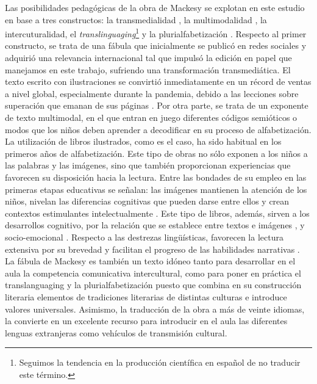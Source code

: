 \documentclass[spanish]{textolivre}
\begin{document}
Las posibilidades pedagógicas de la obra de Mackesy se explotan en este estudio en base a tres constructos: la transmedialidad \cite{scolari_narrativas_2013}, la multimodalidad \cite{hassett_theories_2009,serafini_reading_2012,serafini_multimodal_2015,pantaleo_primary_2016-1}, la intercuturalidad, el \textit{translinguaging}\footnote{Seguimos la tendencia en la producción científica en español de no traducir este término.} y la plurialfabetización \cite{byram_teaching_1997,byram_teaching_2021,garcia_translanguaging_2020,meyer_pluriliteracies_2015}.  Respecto al primer constructo, se trata de una fábula que inicialmente se publicó en redes sociales y adquirió una relevancia internacional tal que impulsó la edición en papel que manejamos en este trabajo, sufriendo una transformación transmediática. El texto escrito con ilustraciones se convirtió inmediatamente en un récord de ventas a nivel global, especialmente durante la pandemia, debido a las lecciones sobre superación que emanan de sus páginas \cite{kobierski_reality_2021}. Por otra parte, se trata de un exponente de texto multimodal, en el que entran en juego diferentes códigos semióticos o modos que los niños deben aprender a decodificar en su proceso de alfabetización. La utilización de libros ilustrados, como es el caso, ha sido habitual en los primeros años de alfabetización. Este tipo de obras no sólo exponen a los niños a las palabras y las imágenes, sino que también proporcionan experiencias que favorecen su disposición hacia la lectura. Entre las bondades de su empleo en las primeras etapas educativas se señalan: las imágenes mantienen la atención de los niños, nivelan las diferencias cognitivas que pueden darse entre ellos y crean contextos estimulantes intelectualmente \cite{jalongo_young_2004}. Este tipo de libros, además, sirven a los desarrollos cognitivo, por la relación que se establece entre textos e imágenes \cite{kummerling-meibauer_picturebooks_2015}, y socio-emocional \cite{harper_using_2016}. Respecto a las destrezas lingüísticas, favorecen la lectura extensiva por su brevedad \cite{birketveit_picture_2015} y facilitan el progreso de las habilidades narrativas \cite{kummerling-meibauer_picturebooks_2015}. La fábula de Mackesy es también un texto idóneo tanto para desarrollar en el aula la competencia comunicativa intercultural, como para poner en práctica el translanguaging y la plurialfabetización puesto que combina en su construcción literaria elementos de tradiciones literarias de distintas culturas e introduce valores universales. Asimismo, la traducción de la obra a más de veinte idiomas, la convierte en un excelente recurso para introducir en el aula las diferentes lenguas extranjeras como vehículos de transmisión cultural.
\end{document}

